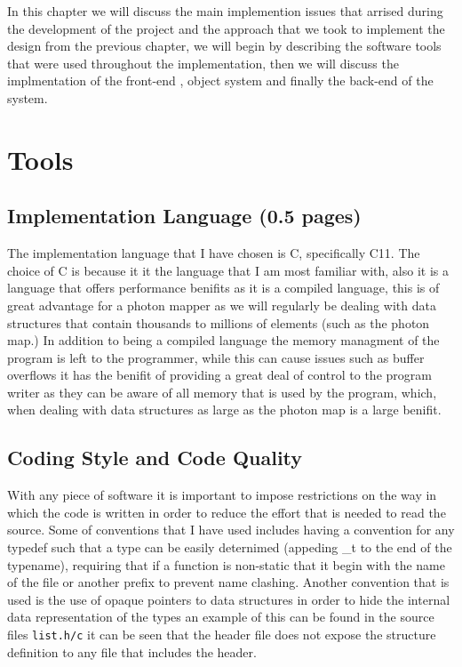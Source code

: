 In this chapter we will discuss the main implemention issues that arrised during the development of the project
and the approach that we took to implement the design from the previous chapter, we will begin by describing the
software tools that were used throughout the implementation, then we will discuss the implmentation of the front-end
, object system and finally the back-end of the system.

\section{Tools} 
\subsection{Implementation Language (0.5 pages)}
The implementation language that I have chosen is C, specifically C11. The choice of C is because it it the
language that I am most familiar with, also it is a language that offers performance benifits as it is a compiled
language, this is of great advantage for a photon mapper as we will regularly be dealing with data structures
that contain thousands to millions of elements (such as the photon map.) In addition to being a compiled language
the memory managment of the program is left to the programmer, while this can cause issues such as buffer overflows
it has the benifit of providing a great deal of control to the program writer as they can be aware of all memory
that is used by the program, which, when dealing with data structures as large as the photon map is a large benifit.

\subsection{Coding Style and Code Quality}
With any piece of software it is important to impose restrictions on the way in which the code is written in order
to reduce the effort that is needed to read the source. Some of conventions that I have used includes having a
convention for any typedef such that a type can be easily deternimed (appeding \_t to the end of the typename),
requiring that if a function is non-static that it begin with the name of the file or another prefix to prevent
name clashing. Another convention that is used is the use of opaque pointers to data structures in order to
hide the internal data representation of the types an example of this can be found in the source files \texttt{list.h/c}
it can be seen that the header file does not expose the structure definition to any file that includes the header.

